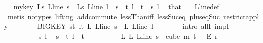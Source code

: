 \begin{isabellebody}
\ \isamarkupfalse%
\ mykey{\isacharcolon}{\kern0pt}\ {\isachardoublequoteopen}{\isasymchi}L{\isacharunderscore}{\kern0pt}s\ {\isacharparenleft}{\kern0pt}L{\isacharunderscore}{\kern0pt}line\ s{\isacharparenright}{\kern0pt}\ {\isacharequal}{\kern0pt}\ {\isasymchi}L{\isacharunderscore}{\kern0pt}s\ {\isacharparenleft}{\kern0pt}L{\isacharunderscore}{\kern0pt}line\ l{\isacharparenright}{\kern0pt}{\isachardoublequoteclose}\ \ {\isachardoublequoteopen}s\ {\isasymin}\ {\isacharbraceleft}{\kern0pt}{\isachardot}{\kern0pt}{\isachardot}{\kern0pt}{\isacharless}{\kern0pt}t{\isacharbraceright}{\kern0pt}{\isachardoublequoteclose}\ {\isachardoublequoteopen}l\ {\isasymin}\ {\isacharbraceleft}{\kern0pt}{\isachardot}{\kern0pt}{\isachardot}{\kern0pt}{\isacharless}{\kern0pt}t{\isacharbraceright}{\kern0pt}{\isachardoublequoteclose}\ \ s\ l\ \isamarkupfalse%
\ that\ \ \isamarkupfalse%
\ L{\isacharunderscore}{\kern0pt}line{\isacharunderscore}{\kern0pt}def\ \isanewline
\ \ \ \ \ \ \ \ \isamarkupfalse%
\ {\isacharparenleft}{\kern0pt}metis\ {\isacharparenleft}{\kern0pt}no{\isacharunderscore}{\kern0pt}types{\isacharcomma}{\kern0pt}\ lifting{\isacharparenright}{\kern0pt}\ add{\isachardot}{\kern0pt}commute\ lessThan{\isacharunderscore}{\kern0pt}iff\ less{\isacharunderscore}{\kern0pt}Suc{\isacharunderscore}{\kern0pt}eq\ plus{\isacharunderscore}{\kern0pt}{}{\isacharunderscore}{\kern0pt}eq{\isacharunderscore}{\kern0pt}Suc\ restrict{\isacharunderscore}{\kern0pt}apply{\isacharparenright}{\kern0pt}\isanewline
\ \ \ \ \ \ \isamarkupfalse%
\ BIGKEY{\isacharcolon}{\kern0pt}\ {\isachardoublequoteopen}{\isasymforall}s{\isacharless}{\kern0pt}t{\isachardot}{\kern0pt}\ {\isasymforall}l{\isacharless}{\kern0pt}t{\isachardot}{\kern0pt}\ {\isasymchi}L\ {\isacharparenleft}{\kern0pt}L{\isacharunderscore}{\kern0pt}line\ s{\isacharparenright}{\kern0pt}\ {\isacharequal}{\kern0pt}\ {\isasymchi}L\ {\isacharparenleft}{\kern0pt}L{\isacharunderscore}{\kern0pt}line\ l{\isacharparenright}{\kern0pt}{\isachardoublequoteclose}\isanewline
\ \ \ \ \ \ \isamarkupfalse%
\ {\isacharparenleft}{\kern0pt}intro\ allI\ impI{\isacharparenright}{\kern0pt}\isanewline
\ \ \ \ \ \ \ \ \isamarkupfalse%
\ s\ l\ \isamarkupfalse%
\ {\isachardoublequoteopen}s\ {\isacharless}{\kern0pt}\ t{\isachardoublequoteclose}\ {\isachardoublequoteopen}l\ {\isacharless}{\kern0pt}\ t{\isachardoublequoteclose}\isanewline
\ \ \ \ \ \ \ \ \isamarkupfalse%
\ L{}{\isacharcolon}{\kern0pt}\ {\isachardoublequoteopen}{\isasymchi}L\ {\isacharparenleft}{\kern0pt}L{\isacharunderscore}{\kern0pt}line\ s{\isacharparenright}{\kern0pt}\ {\isasymin}\ cube\ m\ {\isacharparenleft}{\kern0pt}t\ {\isacharplus}{\kern0pt}\ {}{\isacharparenright}{\kern0pt}\ {\isasymrightarrow}\isactrlsub E\ {\isacharbraceleft}{\kern0pt}{\isachardot}{\kern0pt}{\isachardot}{\kern0pt}{\isacharless}{\kern0pt}r{\isacharbraceright}{\kern0pt}{\isachardoublequoteclose}\ \isamarkupfalse%

\end{isabellebody}
